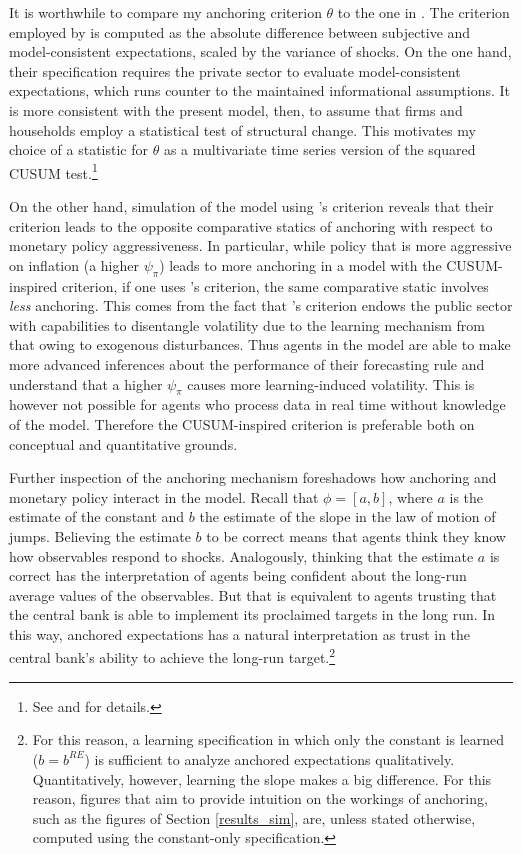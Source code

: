 \documentclass[11pt]{article}
\renewcommand{\[}{\begin{equation}}
\renewcommand{\]}{\end{equation}}
\begin{document}
It is worthwhile to compare my anchoring criterion $\theta$ to the one in \cite{carvalho2019anchored}. The criterion employed by \cite{carvalho2019anchored} is computed as the absolute difference between subjective and model-consistent expectations, scaled by the variance of shocks. On the one hand, their specification requires the private sector to evaluate model-consistent expectations, which runs counter to the maintained informational assumptions. It is more consistent with the present model, then, to assume that firms and households employ a statistical test of structural change. This motivates my choice of a statistic for $\theta$ as a multivariate time series version of the squared CUSUM test.\footnote{See \cite{brown1975techniques} and \cite{lutkepohl2013introduction} for details.} 

On the other hand, simulation of the model using \cite{carvalho2019anchored}'s criterion reveals that their criterion leads to the opposite comparative statics of anchoring with respect to monetary policy aggressiveness. In particular, while policy that is more aggressive on inflation (a higher $\psi_{\pi}$) leads to more anchoring in a model with the CUSUM-inspired criterion, if one uses \cite{carvalho2019anchored}'s criterion, the same comparative static involves \emph{less} anchoring. This comes from the fact that \cite{carvalho2019anchored}'s criterion endows the public sector with capabilities to disentangle volatility due to the learning mechanism from that owing to exogenous disturbances. Thus agents in the \cite{carvalho2019anchored} model are able to make more advanced inferences about the performance of their forecasting rule and understand that a higher $\psi_{\pi}$ causes more learning-induced volatility. This is however not possible for agents who process data in real time without knowledge of the model. Therefore the CUSUM-inspired criterion is preferable both on conceptual and quantitative grounds.

Further inspection of the anchoring mechanism foreshadows how anchoring and monetary policy interact in the model. Recall that $\phi = [a,b]$, where $a$ is the estimate of the constant and $b$ the estimate of the slope in the law of motion of jumps. Believing the estimate $b$ to be correct means that agents think they know how observables respond to shocks. Analogously, thinking that the estimate $a$ is correct has the interpretation of agents being confident about the long-run average values of the observables. But that is equivalent to agents trusting that the central bank is able to implement its proclaimed targets in the long run. In this way, anchored expectations has a natural interpretation as trust in the central bank's ability to achieve the long-run target.\footnote{For this reason, a learning specification in which only the constant is learned ($b= b^{RE}$) is sufficient to analyze anchored expectations qualitatively. Quantitatively, however, learning the slope makes a big difference. For this reason, figures that aim to provide intuition on the workings of anchoring, such as the figures of Section \ref{results_sim}, are, unless stated otherwise, computed using the constant-only specification.} 
\end{document}
